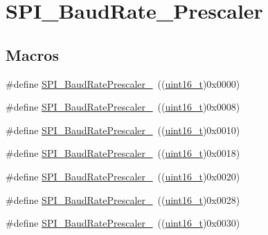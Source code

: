 \hypertarget{group___s_p_i___baud_rate___prescaler}{}\section{S\+P\+I\+\_\+\+Baud\+Rate\+\_\+\+Prescaler}
\label{group___s_p_i___baud_rate___prescaler}
\subsection*{Macros}
\begin{DoxyCompactItemize}
\item 
\#define \hyperlink{group___s_p_i___baud_rate___prescaler_ga88cd6d416c87b382396dbf4c02e3bd4b}{S\+P\+I\+\_\+\+Baud\+Rate\+Prescaler\+\_}~((\hyperlink{_p_e___types_8h_a1f1825b69244eb3ad2c7165ddc99c956}{uint16\+\_\+t})0x0000)
\item 
\#define \hyperlink{group___s_p_i___baud_rate___prescaler_ga17ac4858cb9387289ee7c3d94a9b54be}{S\+P\+I\+\_\+\+Baud\+Rate\+Prescaler\+\_}~((\hyperlink{_p_e___types_8h_a1f1825b69244eb3ad2c7165ddc99c956}{uint16\+\_\+t})0x0008)
\item 
\#define \hyperlink{group___s_p_i___baud_rate___prescaler_ga023a1e4c04586f2feb0d4b03b2e0c230}{S\+P\+I\+\_\+\+Baud\+Rate\+Prescaler\+\_}~((\hyperlink{_p_e___types_8h_a1f1825b69244eb3ad2c7165ddc99c956}{uint16\+\_\+t})0x0010)
\item 
\#define \hyperlink{group___s_p_i___baud_rate___prescaler_ga5ef8587bb96e3ec98e9fde770756fc7d}{S\+P\+I\+\_\+\+Baud\+Rate\+Prescaler\+\_}~((\hyperlink{_p_e___types_8h_a1f1825b69244eb3ad2c7165ddc99c956}{uint16\+\_\+t})0x0018)
\item 
\#define \hyperlink{group___s_p_i___baud_rate___prescaler_ga1d30cecaa412cee5250c69644207c652}{S\+P\+I\+\_\+\+Baud\+Rate\+Prescaler\+\_}~((\hyperlink{_p_e___types_8h_a1f1825b69244eb3ad2c7165ddc99c956}{uint16\+\_\+t})0x0020)
\item 
\#define \hyperlink{group___s_p_i___baud_rate___prescaler_ga2c9cd96ed56432a83f8e4f46fbecb5e6}{S\+P\+I\+\_\+\+Baud\+Rate\+Prescaler\+\_}~((\hyperlink{_p_e___types_8h_a1f1825b69244eb3ad2c7165ddc99c956}{uint16\+\_\+t})0x0028)
\item 
\#define \hyperlink{group___s_p_i___baud_rate___prescaler_gafa6c39c3ee16a08730356a5cd30f3648}{S\+P\+I\+\_\+\+Baud\+Rate\+Prescaler\+\_}~((\hyperlink{_p_e___types_8h_a1f1825b69244eb3ad2c7165ddc99c956}{uint16\+\_\+t})0x0030)
\item 

\end{DoxyCompactItemize}
